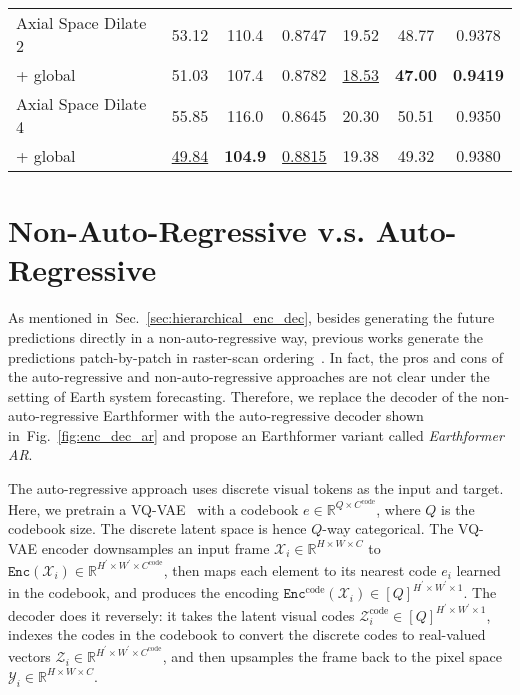 \documentclass{article}
\newcommand{\bgray}[1]{\colorbox{myGray}{#1}}
\newcommand{\secref}[1]{Sec.~\ref{#1}}
\newcommand{\figref}[1]{Fig.~\ref{#1}}
\begin{document}
\begin{table}[!tb]
\begin{center}
{\begin{tabular}{l|ccc|ccc}
	\midrule
	Axial Space Dilate 2& 53.12				& 110.4				& 0.8747			& 19.52				& 48.77				& 0.9378				\\
	+ global            & \bgray{51.03}		& \bgray{107.4}		& \bgray{0.8782}	& \bgray{\underline{18.53}}& \bgray{\textbf{47.00}}	& \bgray{\textbf{0.9419}}		\\
	\midrule
	Axial Space Dilate 4& 55.85				& 116.0				& 0.8645			& 20.30				& 50.51				& 0.9350			\\
	+ global            & \bgray{\underline{49.84}}& \bgray{\textbf{104.9}}	& \bgray{\underline{0.8815}}& \bgray{19.38}	& \bgray{49.32}	& \bgray{0.9380}				\\
	\bottomrule[1.5pt]
	\end{tabular}
	}  \end{center}
\end{table}










\clearpage
\section{Non-Auto-Regressive v.s. Auto-Regressive}
\label{sec:nar-vs-ar}
As mentioned in~\secref{sec:hierarchical_enc_dec}, besides generating the future predictions directly in a non-auto-regressive way, previous works generate the predictions patch-by-patch in raster-scan ordering~\cite{weissenborn2019scaling,yan2021videogpt,rakhimov2020latent}. 
In fact, the pros and cons of the auto-regressive and non-auto-regressive approaches are not clear under the setting of Earth system forecasting. 
Therefore, we replace the decoder of the non-auto-regressive Earthformer with the auto-regressive decoder shown in~\figref{fig:enc_dec_ar} and propose an Earthformer variant called \emph{Earthformer AR}.

The auto-regressive approach uses discrete visual tokens as the input and target. Here, we pretrain a VQ-VAE~\cite{van2017neural} with a codebook $e\in\mathbb{R}^{Q\times C^{\text{code}}}$, where $Q$ is the codebook size. The discrete latent space is hence $Q$-way categorical. 
The VQ-VAE encoder downsamples an input frame $\mathcal{X}_i\in\mathbb{R}^{H\times W\times C}$ to $\mathtt{Enc}(\mathcal{X}_i)\in\mathbb{R}^{H^\prime \times W^\prime \times C^{\text{code}}}$, then maps each element to its nearest code $e_{i}$ learned in the codebook, and produces the encoding $\mathtt{Enc}^{\text{code}}(\mathcal{X}_i)\in[Q]^{H^\prime \times W^\prime \times 1}$. 
The decoder does it reversely: it takes the latent visual codes $\mathcal{Z}^{\text{code}}_i\in[Q]^{H^\prime \times W^\prime \times 1}$, indexes the codes in the codebook to convert the discrete codes to real-valued vectors $\mathcal{Z}_i\in\mathbb{R}^{H^\prime \times W^\prime \times C^{\text{code}}}$, and then upsamples the frame back to the pixel space $\mathcal{Y}_i\in\mathbb{R}^{H\times W\times C}$.
\end{document}
